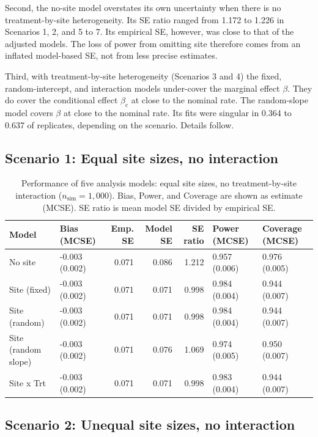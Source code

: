 \documentclass[
  11pt,
]{article}
\begin{document}
Second, the no-site model overstates its own uncertainty when
there is no treatment-by-site heterogeneity. Its SE ratio ranged
from 1.172 to 1.226 in Scenarios
1, 2, and 5 to 7. Its empirical SE, however, was close to that of
the adjusted models. The loss of power from omitting site therefore
comes from an inflated model-based SE, not from less precise
estimates.

Third, with treatment-by-site heterogeneity (Scenarios 3 and 4) the
fixed, random-intercept, and interaction models under-cover the
marginal effect \(\beta\). They do cover the conditional effect
\(\beta_{\mathrm{c}}\) at close to the nominal rate. The random-slope
model covers \(\beta\) at close to the nominal rate. Its fits were
singular in 0.364 to 0.637 of
replicates, depending on the scenario. Details follow.

\subsection{Scenario 1: Equal site sizes, no interaction}\label{scenario-1-equal-site-sizes-no-interaction}

\begin{table}[!h]
\centering
\caption{\label{tab:tab-equal-no}Performance of five analysis models: equal site sizes, no treatment-by-site interaction ($n_{\mathrm{sim}} = 1{,}000$). Bias, Power, and Coverage are shown as estimate (MCSE). SE ratio is mean model SE divided by empirical SE.}
\centering
\fontsize{8}{10}\selectfont
\begin{tabular}[t]{llrrrll}
\toprule
Model & Bias (MCSE) & Emp. SE & Model SE & SE ratio & Power (MCSE) & Coverage (MCSE)\\
\midrule
No site & -0.003 (0.002) & 0.071 & 0.086 & 1.212 & 0.957 (0.006) & 0.976 (0.005)\\
Site (fixed) & -0.003 (0.002) & 0.071 & 0.071 & 0.998 & 0.984 (0.004) & 0.944 (0.007)\\
Site (random) & -0.003 (0.002) & 0.071 & 0.071 & 0.998 & 0.984 (0.004) & 0.944 (0.007)\\
Site (random slope) & -0.003 (0.002) & 0.071 & 0.076 & 1.069 & 0.974 (0.005) & 0.950 (0.007)\\
Site x Trt & -0.003 (0.002) & 0.071 & 0.071 & 0.998 & 0.983 (0.004) & 0.944 (0.007)\\
\bottomrule
\end{tabular}
\end{table}

\subsection{Scenario 2: Unequal site sizes, no interaction}\label{scenario-2-unequal-site-sizes-no-interaction}
\end{document}
